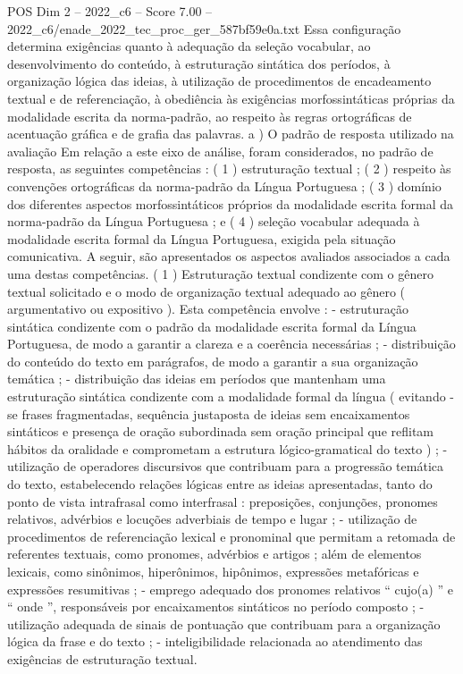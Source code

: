 \begin{textsample}{POS Dim 2 – 2022\_c6 – Score 7.00 – 2022\_c6/enade\_2022\_tec\_proc\_ger\_587bf59e0a.txt}
Essa configuração determina exigências quanto à adequação da seleção vocabular, ao desenvolvimento do conteúdo, à estruturação sintática dos períodos, à organização lógica das ideias, à utilização de procedimentos de encadeamento textual e de referenciação, à obediência às exigências morfossintáticas próprias da modalidade escrita da norma-padrão, ao respeito às regras ortográficas de acentuação gráfica e de grafia das palavras. a ) O padrão de resposta utilizado na avaliação Em relação a este eixo de análise, foram considerados, no padrão de resposta, as seguintes competências : ( 1 ) estruturação textual ; ( 2 ) respeito às convenções ortográficas da norma-padrão da Língua Portuguesa ; ( 3 ) domínio dos diferentes aspectos morfossintáticos próprios da modalidade escrita formal da norma-padrão da Língua Portuguesa ; e ( 4 ) seleção vocabular adequada à modalidade escrita formal da Língua Portuguesa, exigida pela situação comunicativa.
A seguir, são apresentados os aspectos avaliados associados a cada uma destas competências. ( 1 ) Estruturação textual condizente com o gênero textual solicitado e o modo de organização textual adequado ao gênero ( argumentativo ou expositivo ).
Esta competência envolve : - estruturação sintática condizente com o padrão da modalidade escrita formal da Língua Portuguesa, de modo a garantir a clareza e a coerência necessárias ; - distribuição do conteúdo do texto em parágrafos, de modo a garantir a sua organização temática ; - distribuição das ideias em períodos que mantenham uma estruturação sintática condizente com a modalidade formal da língua ( evitando -se frases fragmentadas, sequência justaposta de ideias sem encaixamentos sintáticos e presença de oração subordinada sem oração principal que reflitam hábitos da oralidade e comprometam a estrutura lógico-gramatical do texto ) ; - utilização de operadores discursivos que contribuam para a progressão temática do texto, estabelecendo relações lógicas entre as ideias apresentadas, tanto do ponto de vista intrafrasal como interfrasal : preposições, conjunções, pronomes relativos, advérbios e locuções adverbiais de tempo e lugar ; - utilização de procedimentos de referenciação lexical e pronominal que permitam a retomada de referentes textuais, como pronomes, advérbios e artigos ; além de elementos lexicais, como sinônimos, hiperônimos, hipônimos, expressões metafóricas e expressões resumitivas ; - emprego adequado dos pronomes relativos “ cujo(a) ” e “ onde ”, responsáveis por encaixamentos sintáticos no período composto ; - utilização adequada de sinais de pontuação que contribuam para a organização lógica da frase e do texto ; - inteligibilidade relacionada ao atendimento das exigências de estruturação textual.

\end{textsample}
